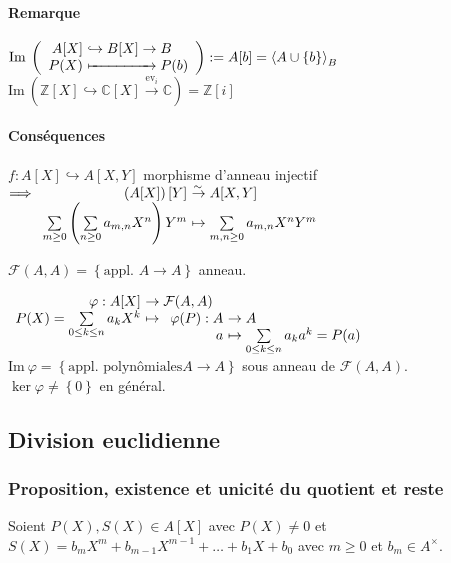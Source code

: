 \documentclass[reqno,a4paper,10pt]{report}
\makeatletter
\newcommand{\gen}[1]{\left\langle #1 \right\rangle} %
\newcommand{\set}[1]{\left\lbrace #1 \right\rbrace} %
\newcommand{\im}{\mathrm{Im}\:} %
\newcommand{\IZ}{\ensuremath{\mathbb{Z}}\xspace} %
\newcommand{\IC}{\ensuremath{\mathbb{C}}\xspace} %
\newcommand{\soo}{\Longrightarrow}
\newcommand{\inj}{\hookrightarrow}
\newcommand{\bij}{\overset{\!\sim}{\to}} %
\newcommand{\ev}[1]{\mathrm{ev}_{ #1 }}
\let\oldenumerate=\enumerate%
\renewenvironment{enumerate}{%
    \oldenumerate%
  }{%
    \@noparlisttrue%
    \endlist%
  }%
\makeatother
\begin{document}
\paragraph{Remarque} $\im \left( \begin{array}{r@{\ }l}
  A[X] &\inj B[X] \to B \\
  P(X) &\xmapsto{\hphantom{\!\textstyle \!\inj B[X] \to\!\!}}  P(b)
\end{array}\right):=A[b]=\gen{A\cup\set{b}}_B$\\
$\im\left( \IZ[X] \inj \IC[X] \xrightarrow{\ev i} \IC\right)=\IZ[i]$

\paragraph{Conséquences}
\begin{enumerate}
  \item $f:A[X] \inj A[X,Y]$ morphisme d'anneau injectif\\
    $\soo \begin{array}[t]{r@{\ }l}
      \left( A[X] \right)[Y] &\bij A[X,Y]\\
      \sum\limits_{m\geq 0} \left( \sum\limits_{n\geq 0} a_{m,n} X^n \right)
      Y^m &\mapsto \sum\limits_{m,n \geq 0} a_{m,n} X^n Y^m
    \end{array}$
  \item $\mathcal{F}(A,A)=\set{\text{appl. } A \to A}$ anneau.

    $\begin{array}[t]{r@{\ }l}
      \varphi : A[X] &\to \mathcal{F}(A,A)\\
      P(X)=\sum\limits_{0\leq k \leq n} a_k X^k &\mapsto
      \begin{array}[t]{r@{\ }l}
        \varphi(P) : A &\to A\\
        a &\mapsto \sum\limits_{0\leq k \leq n} a_k a^k = P(a)
      \end{array}
    \end{array}$\\
    $\im \varphi = \set{\text{appl. polynômiales} A \to A}$ sous anneau de
    $\mathcal F(A,A)$.\\
    $\ker \varphi \neq \set{0}$ en général.
\end{enumerate}

\subsection{Division euclidienne}
\subsubsection{Proposition, existence et unicité du quotient et reste}
Soient $P(X), S(X) \in A[X]$ avec $P(X) \neq 0$ et $S(X)=b_m X^m +
b_{m-1} X^{m-1} + \dots + b_1 X + b_0$ avec $m\geq 0$ et $b_m \in A^\times$.
\end{document}
